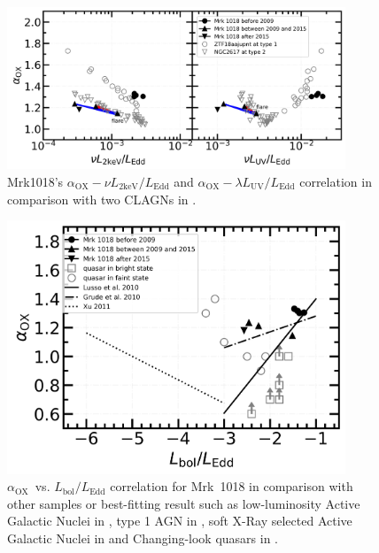 \documentclass[twocolumn]{aastex63}
\newcommand{\alphaox}{$\alpha_\mathrm{OX}$}
\begin{document}
\begin{figure}
\centering
	\includegraphics[width=0.9\textwidth]{./pic/Mrk1018_subplots_plus_2individuals_alpha_ox_L_x_Luv_rate.png}
    \caption{Mrk1018's $\alpha_\mathrm{OX}-\nu L_\mathrm{2keV}/L_\mathrm{Edd}$ and $\alpha_\mathrm{OX}-\lambda L_\mathrm{UV}/L_\mathrm{Edd}$ correlation in comparison with two CLAGNs in \citet{2019arXiv190904676R}.}   
    \label{fig:alpha_ox_lx_luv}
\end{figure}

\begin{figure}
\centering
	\includegraphics[width=0.9\textwidth]{./pic/Mrk1018_subplots_plus_alpha_ox_logLbol_rate.png}
    \caption{\alphaox\, vs. $L_\mathrm{bol}/L_\mathrm{Edd}$ correlation for Mrk~1018 in comparison with other samples or best-fitting result such as low-luminosity Active Galactic Nuclei in \citet[][]{2011ApJ...739...64X}, type 1 AGN in \citet{2010A&A...512A..34L}, soft X-Ray selected Active Galactic Nuclei in \citet[][]{2010ApJS..187...64G} and Changing-look quasars in \citet[][]{2019ApJ...883...76R}. }
    \label{fig:alphaox-bol}
\end{figure}
\end{document}
